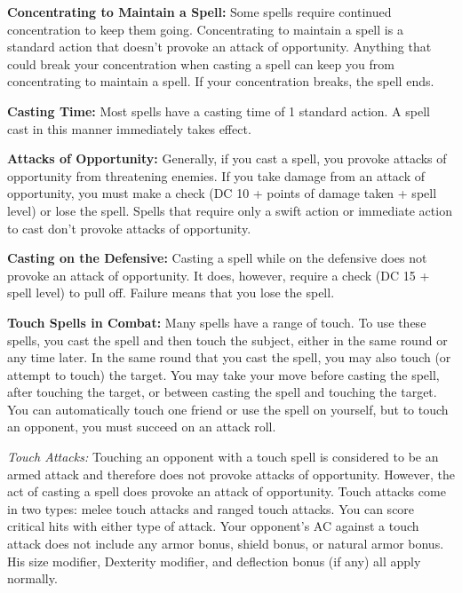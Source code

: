 \textbf{Concentrating to Maintain a Spell:} Some spells require continued concentration to keep them going. Concentrating to maintain a spell is a standard action that doesn't provoke an attack of opportunity. Anything that could break your concentration when casting a spell can keep you from concentrating to maintain a spell. If your concentration breaks, the spell ends.

\textbf{Casting Time:} Most spells have a casting time of 1 standard action. A spell cast in this manner immediately takes effect.

\textbf{Attacks of Opportunity:} Generally, if you cast a spell, you provoke attacks of opportunity from threatening enemies. If you take damage from an attack of opportunity, you must make a  check (DC 10 + points of damage taken + spell level) or lose the spell. Spells that require only a swift action or immediate action to cast don't provoke attacks of opportunity.

\textbf{Casting on the Defensive:} Casting a spell while on the defensive does not provoke an attack of opportunity. It does, however, require a  check (DC 15 + spell level) to pull off. Failure means that you lose the spell.


\textbf{Touch Spells in Combat:} Many spells have a range of touch. To use these spells, you cast the spell and then touch the subject, either in the same round or any time later. In the same round that you cast the spell, you may also touch (or attempt to touch) the target. You may take your move before casting the spell, after touching the target, or between casting the spell and touching the target. You can automatically touch one friend or use the spell on yourself, but to touch an opponent, you must succeed on an attack roll.

\textit{Touch Attacks:} Touching an opponent with a touch spell is considered to be an armed attack and therefore does not provoke attacks of opportunity. However, the act of casting a spell does provoke an attack of opportunity. Touch attacks come in two types: melee touch attacks and ranged touch attacks. You can score critical hits with either type of attack. Your opponent's AC against a touch attack does not include any armor bonus, shield bonus, or natural armor bonus. His size modifier, Dexterity modifier, and deflection bonus (if any) all apply normally.

